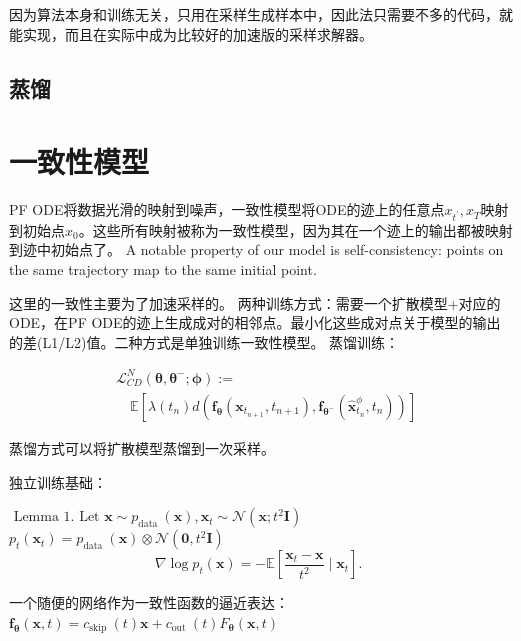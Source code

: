 \documentclass[lang=cn,newtx,10pt,scheme=chinese]{elegantbook}
\begin{document}
因为算法本身和训练无关，只用在采样生成样本中，因此法只需要不多的代码，就能实现，而且在实际中成为比较好的加速版的采样求解器。
\subsection{蒸馏}


\section{一致性模型}
PF ODE将数据光滑的映射到噪声，一致性模型将ODE的迹上的任意点$x_{t^{\prime}}, x_T$映射到初始点$x_0$。这些所有映射被称为一致性模型，因为其在一个迹上的输出都被映射到迹中初始点了。 A notable property of our model is self-consistency: points on the same trajectory map to the same initial point.

这里的一致性主要为了加速采样的。
两种训练方式：需要一个扩散模型+对应的ODE，在PF ODE的迹上生成成对的相邻点。最小化这些成对点关于模型的输出的差(L1/L2)值。二种方式是单独训练一致性模型。
蒸馏训练：

$$\begin{aligned} & \mathcal{L}_{C D}^N\left(\boldsymbol{\theta}, \boldsymbol{\theta}^{-} ; \boldsymbol{\phi}\right):= \\ & \quad \mathbb{E}\left[\lambda\left(t_n\right) d\left(\boldsymbol{f}_{\boldsymbol{\theta}}\left(\mathbf{x}_{t_{n+1}}, t_{n+1}\right), \boldsymbol{f}_{\boldsymbol{\theta}^{-}}\left(\hat{\mathbf{x}}_{t_n}^\phi, t_n\right)\right)\right]\end{aligned}$$

蒸馏方式可以将扩散模型蒸馏到一次采样。

独立训练基础：

$\text { Lemma 1. Let } \mathbf{x} \sim p_{\text {data }}(\mathbf{x}), \mathbf{x}_t \sim \mathcal{N}\left(\mathbf{x} ; t^2 \boldsymbol{I}\right)$   $p_t\left(\mathbf{x}_t\right)=p_{\text {data }}(\mathbf{x}) \otimes \mathcal{N}\left(\mathbf{0}, t^2 \boldsymbol{I}\right) $  
\begin{equation} 
  \nabla \log p_t(\mathbf{x})=-\mathbb{E}\left[\frac{\mathbf{x}_t-\mathbf{x}}{t^2} \mid \mathbf{x}_t\right] \text {. }
\end{equation}

一个随便的网络作为一致性函数的逼近表达：
$\boldsymbol{f}_{\boldsymbol{\theta}}(\mathbf{x}, t)=c_{\text {skip }}(t) \mathbf{x}+c_{\text {out }}(t) F_{\boldsymbol{\theta}}(\mathbf{x}, t)$
\end{document}
